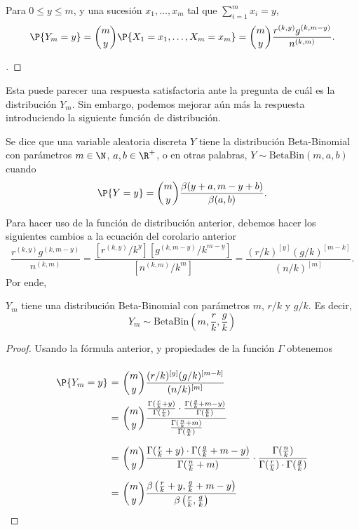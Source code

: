 \begin{corollary}\label{polya-mass-Y}
    Para $0\leq y \leq m$, y una sucesión $x_1,\ldots,x_m$ tal que $\sum_{i = 1}^m x_i = y$,
    \[ \P\{Y_m = y\} = \binom{m}{y} \P\{X_1 = x_1,\ldots, X_m = x_m\} = \binom{m}{y}\frac{r^{(k,y)} g^{(k,m-y)}}{n^{(k,m)}}.\]
\end{corollary}
\begin{proof}[]
    \vspace*{-2em}
\end{proof}

Esta puede parecer una respuesta satisfactoria ante la pregunta de cuál es la distribución $Y_m$. Sin embargo, podemos mejorar aún más la respuesta introduciendo la siguiente función de distribución.

\begin{definition} Se dice que una variable aleatoria discreta $Y$ tiene la distribución Beta-Binomial con parámetros $m\in \N$, $a,b\in \R^+$, o en otras palabras, $Y\sim\text{BetaBin}(m,a,b)$ cuando
    \[ \P\{Y = y\} = \binom{m}{y}\frac{\beta(y+a,m-y+b)}{\beta(a,b)}. \]    
\end{definition}

Para hacer uso de la función de distribución anterior, debemos hacer los siguientes cambios a la ecuación del corolario anterior
\[ \frac{r^{(k,y)} g^{(k,m-y)}}{n^{(k,m)}} = \frac{[r^{(k,y)}/k^y] [g^{(k,m-y)}/k^{m-y}]}{[n^{(k,m)}/k^m]} = \frac{(r/k)^{[y]}(g/k)^{[m-k]}}{(n/k)^{[m]}}. \]
Por ende,

\begin{theorem} 
    $Y_m$ tiene una distribución Beta-Binomial con parámetros $m$, $r/k$ y $g/k$. Es decir,
    \[ Y_m\sim \text{BetaBin}\left( m, \frac{r}{k}, \frac{g}{k} \right) \]
\end{theorem}

\begin{proof} Usando la fórmula anterior, y propiedades de la función $\Gamma$ obtenemos
    \[ \everymath{\displaystyle}
    \arraycolsep=1.8pt\def\arraystretch{3}
    \begin{array}{rcl}
        \P\{Y_m = y\} & = & \binom{m}{y} \frac{(r/k)^{[y]}(g/k)^{[m-k]}}{(n/k)^{[m]}} \\
        & = & \binom{m}{y} \frac{\frac{\Gamma(\frac{r}{k}+y)}{\Gamma(\frac{r}{k})} \cdot \frac{\Gamma(\frac{g}{k}+m-y)}{\Gamma(\frac{g}{k})}}{\frac{\Gamma(\frac{n}{k}+m)}{\Gamma(\frac{n}{k})}} \\
        & = & \binom{m}{y} \frac{\Gamma(\frac{r}{k}+y) \cdot \Gamma(\frac{g}{k}+m-y)}{\Gamma(\frac{n}{k}+m)} \cdot \frac{\Gamma(\frac{n}{k})}{\Gamma(\frac{r}{k}) \cdot \Gamma(\frac{g}{k})} \\
        & = & \binom{m}{y} \frac{\beta\left( \frac{r}{k} + y, \frac{g}{k} + m - y \right)}{\beta\left( \frac{r}{k}, \frac{g}{k} \right)} 
    \end{array}\]
\end{proof}



